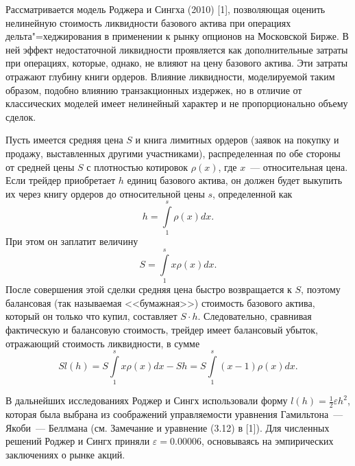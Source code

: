 \vzmscaption

Рассматривается модель Роджера и Сингха (2010) [1], позволяющая оценить нелинейную стоимость ликвидности базового актива при операциях дельта"=хеджирования в применении к рынку опционов на Московской Бирже.
В ней эффект недостаточной ликвидности проявляется как дополнительные затраты при операциях, которые, однако, не влияют на цену базового актива. Эти затраты отражают глубину книги ордеров. Влияние ликвидности, моделируемой таким образом, подобно влиянию транзакционных издержек, но в отличие от классических моделей имеет нелинейный характер и не пропорционально объему сделок.

Пусть имеется средняя цена $S$ и книга лимитных ордеров (заявок на покупку и продажу, выставленных другими участниками), распределенная по обе стороны от средней цены $S$ с плотностью котировок $\rho(x)$, где $x$~--- относительная цена. Если трейдер приобретает $h$ единиц базового актива, он должен будет выкупить их через книгу ордеров до относительной цены $s$, определенной как
\begin{equation*}
h = \int\limits_1^s \rho(x)dx.
\end{equation*}
При этом он заплатит величину
\begin{equation*}
S=\int\limits_1^s x \rho(x) dx.
\end{equation*}
После совершения этой сделки средняя цена быстро возвращается к $S$, поэтому балансовая (так называемая <<бумажная>>) стоимость базового актива, который он только что купил, составляет $S \cdot h$. Следовательно, сравнивая фактическую и балансовую стоимость, трейдер имеет балансовый убыток, отражающий стоимость ликвидности, в сумме
\begin{equation*}
S l(h) = S \int\limits_1^s x \rho(x) dx - Sh = S \int\limits_1^s (x-1) \rho(x) dx.
\end{equation*}

В дальнейших исследованиях Роджер и Сингх использовали форму $l (h) = \frac12 \varepsilon h^2$, которая была выбрана из соображений управляемости уравнения Гамильтона~--- Якоби~--- Беллмана (см. Замечание и уравнение (3.12) в [1]). Для численных решений Роджер и Сингх приняли $\varepsilon = 0.00006$, основываясь на эмпирических заключениях о рынке акций.

